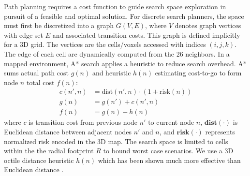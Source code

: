 Path planning requires a cost function to guide search space exploration in pursuit of a feasible and optimal solution. For discrete search planners, the space must first be discretized into a graph ${G}({V},{E})$, where ${V}$ denotes graph vertices with edge set ${E}$ and associated transition costs. This graph is defined implicitly for a 3D grid. The vertices are the cells/voxels accessed with indices $(i,j,k)$. The edge of each cell are dynamically computed from the 26 neighbors. In a mapped environment, A* search applies a heuristic to reduce search overhead.  A* sums actual path cost $g(n)$ and heuristic $h(n)$ estimating cost-to-go to form node $n$ total cost $f(n)$:
\begin{align}
    c(n', n) &= \text{dist}(n', n) 
    \cdot (1 + \text{risk}(n)) \label{eq:risk_function_planner} \\ 
    g(n) &= g(n') + c(n', n)\\
    f(n) &= g(n) + h(n)
\end{align}
where $c$ is transition cost from previous node $n'$ to current node $n$, 
$\mathbf{dist}(\cdot)$ is Euclidean distance between adjacent nodes $n'$ and $n$, and $\mathbf{risk}(\cdot)$ represents normalized risk encoded in the 3D map. 
The search space is limited to cells within the the radial footprint $R$ to bound worst case scenarios. We use a 3D octile distance heuristic $h(n)$ which has been shown much more effective than Euclidean distance \cite{nash_lazy_2010}.  %



